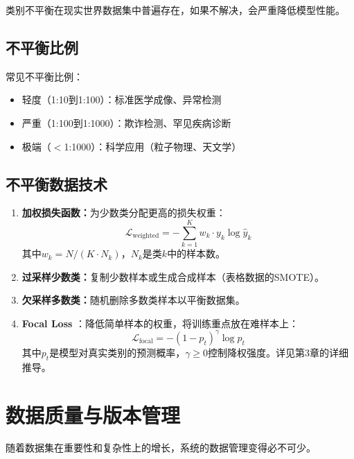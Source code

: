 类别不平衡在现实世界数据集中普遍存在，如果不解决，会严重降低模型性能。

\subsection{不平衡比例}

常见不平衡比例：
\begin{itemize}
    \item 轻度（1:10到1:100）：标准医学成像、异常检测
    \item 严重（1:100到1:1000）：欺诈检测、罕见疾病诊断
    \item 极端（$<$1:1000）：科学应用（粒子物理、天文学）
\end{itemize}

\subsection{不平衡数据技术}

\begin{enumerate}
    \item \textbf{加权损失函数：}为少数类分配更高的损失权重：
    \begin{equation}
    \mathcal{L}_{\text{weighted}} = -\sum_{k=1}^{K} w_k \cdot y_k \log \hat{y}_k
    \end{equation}
    其中$w_k = N / (K \cdot N_k)$，$N_k$是类$k$中的样本数。
    
    \item \textbf{过采样少数类：}复制少数样本或生成合成样本（表格数据的SMOTE）。
    
    \item \textbf{欠采样多数类：}随机删除多数类样本以平衡数据集。
    
    \item \textbf{Focal Loss} \cite{lin2017focal}：降低简单样本的权重，将训练重点放在难样本上：
    \begin{equation}
    \mathcal{L}_{\text{focal}} = -(1 - p_t)^\gamma \log p_t
    \end{equation}
    其中$p_t$是模型对真实类别的预测概率，$\gamma \geq 0$控制降权强度。详见第3章的详细推导。
\end{enumerate}

\section{数据质量与版本管理}

随着数据集在重要性和复杂性上的增长，系统的数据管理变得必不可少。

